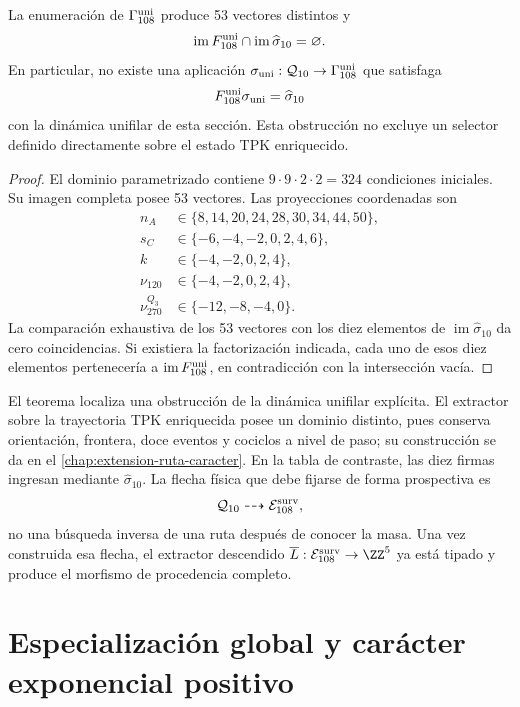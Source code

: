 \begin{theorem}
La enumeración de \(\Gamma_{108}^{\rm uni}\) produce 53 vectores distintos y
\[
 \operatorname{im}F_{108}^{\rm uni}
 \cap\operatorname{im}\widehat\sigma_{10}=\varnothing .
\]
En particular, no existe una aplicación
\(\sigma_{\rm uni}:\mathcal Q_{10}
\to\Gamma_{108}^{\rm uni}\) que satisfaga
\[
 F_{108}^{\rm uni}\sigma_{\rm uni}
 =\widehat\sigma_{10}
\]
con la dinámica unifilar de esta sección. Esta obstrucción no excluye un
selector definido directamente sobre el estado TPK enriquecido.
\end{theorem}
\begin{proof}
El dominio parametrizado contiene
\(9\cdot9\cdot2\cdot2=324\) condiciones iniciales. Su imagen completa posee
53 vectores. Las proyecciones coordenadas son
\[
\begin{aligned}
n_A&\in\{8,14,20,24,28,30,34,44,50\},\\
s_C&\in\{-6,-4,-2,0,2,4,6\},\\
k&\in\{-4,-2,0,2,4\},\\
\nu_{120}&\in\{-4,-2,0,2,4\},\\
\nu_{270}^{Q_3}&\in\{-12,-8,-4,0\}.
\end{aligned}
\]
La comparación exhaustiva de los 53 vectores con los diez elementos de
\(\operatorname{im}\widehat\sigma_{10}\) da cero coincidencias. Si existiera
la factorización indicada, cada uno de esos diez elementos pertenecería a
\(\operatorname{im}F_{108}^{\rm uni}\), en contradicción con la intersección
vacía.
\end{proof}

El teorema localiza una obstrucción de la dinámica unifilar explícita. El
extractor sobre la trayectoria TPK enriquecida posee un dominio distinto,
pues conserva orientación, frontera, doce eventos y cociclos a nivel de paso;
su construcción se da en el \cref{chap:extension-ruta-caracter}. En la tabla
de contraste, las diez firmas ingresan mediante
\(\widehat\sigma_{10}\). La flecha física que debe fijarse de forma
prospectiva es
\[
 \mathcal Q_{10}\dashrightarrow\mathcal E_{108}^{\rm surv},
\]
no una búsqueda inversa de una ruta después de conocer la masa. Una vez
construida esa flecha, el extractor descendido
\(\overline L:\mathcal E_{108}^{\rm surv}\to\ZZ^5\) ya está tipado y
produce el morfismo de procedencia completo.

\section{Especialización global y carácter exponencial positivo}

